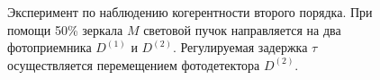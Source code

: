 \begin{figure}
\centering



\caption{Эксперимент по наблюдению когерентности второго порядка. При
  помощи 50\% зеркала $M$ световой пучок направляется на два
  фотоприемника $D^{(1)}$ и $D^{(2)}$. Регулируемая задержка $\tau$
  осуществляется перемещением фотодетектора $D^{(2)}$.}
\label{figPart4Ch2_4}
\end{figure}
